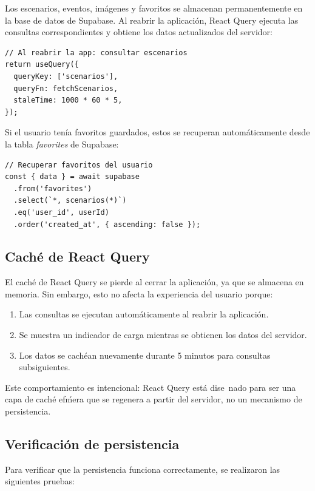 Los escenarios, eventos, im\'agenes y favoritos se almacenan
permanentemente en la base de datos de Supabase. Al reabrir la
aplicaci\'on, React Query ejecuta las consultas correspondientes
y obtiene los datos actualizados del servidor:

\begin{lstlisting}
// Al reabrir la app: consultar escenarios
return useQuery({
  queryKey: ['scenarios'],
  queryFn: fetchScenarios,
  staleTime: 1000 * 60 * 5,
});
\end{lstlisting}

Si el usuario ten\'ia favoritos guardados, estos se recuperan
autom\'aticamente desde la tabla \textit{favorites} de Supabase:

\begin{lstlisting}
// Recuperar favoritos del usuario
const { data } = await supabase
  .from('favorites')
  .select(`*, scenarios(*)`)
  .eq('user_id', userId)
  .order('created_at', { ascending: false });
\end{lstlisting}

\subsection{Cach\'e de React Query}

El cach\'e de React Query se pierde al cerrar la aplicaci\'on,
ya que se almacena en memoria. Sin embargo, esto no afecta la
experiencia del usuario porque:

\begin{enumerate}
  \item Las consultas se ejecutan autom\'aticamente al reabrir
    la aplicaci\'on.
  \item Se muestra un indicador de carga mientras se obtienen
    los datos del servidor.
  \item Los datos se cach\'ean nuevamente durante 5 minutos
    para consultas subsiguientes.
\end{enumerate}

Este comportamiento es intencional: React Query est\'a dise~nado
para ser una capa de cach\'e ef\'mera que se regenera a partir del
servidor, no un mecanismo de persistencia.

\subsection{Verificaci\'on de persistencia}

Para verificar que la persistencia funciona correctamente, se
realizaron las siguientes pruebas:

